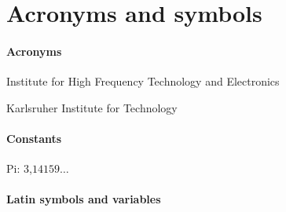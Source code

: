 \chapter*{Acronyms and symbols}
\label{cha:Abbreviations and symbols}


\subsubsection*{Acronyms}
\begin{description}[leftmargin=\widthof{\textbf{XXXXXXX}\hspace{\labelsep}},style=nextline]
	\item[$\mathbf{IHE}$] Institute for High Frequency Technology and Electronics
	\item[$\mathbf{KIT}$] Karlsruher Institute for Technology
\end{description}


\subsubsection*{Constants}
\begin{description}[leftmargin=\widthof{\textbf{XXXXXXX}\hspace{\labelsep}},style=nextline]
	\item[$\pi$] Pi: $3$,$14159\ldots$
\end{description}


\subsubsection*{Latin symbols and variables}

